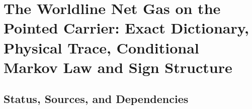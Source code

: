 \section{The Worldline Net Gas on the Pointed Carrier: Exact Dictionary, Physical Trace, Conditional Markov Law and Sign Structure}
\label{sec:worldline-net-gas}

\subsection{Status, Sources, and Dependencies}

